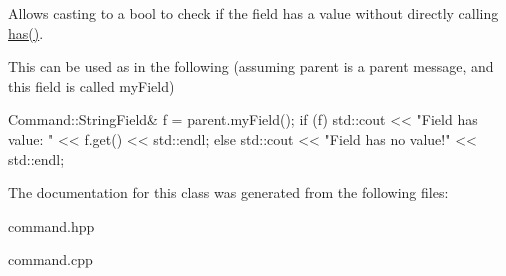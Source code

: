 Allows casting to a bool to check if the field has a value without directly calling {\ttfamily \hyperlink{classhebi_1_1Command_1_1StringField_a41f4d911e4445fc246c185a8b81b3788}{has()}}. 

This can be used as in the following (assuming \textquotesingle{}parent\textquotesingle{} is a parent message, and this field is called \textquotesingle{}my\+Field\textquotesingle{}) 
\begin{DoxyCode}
Command::StringField& f = parent.myField();
\textcolor{keywordflow}{if} (f)
  std::cout << \textcolor{stringliteral}{"Field has value: "} << f.get() << std::endl;
\textcolor{keywordflow}{else}
  std::cout << \textcolor{stringliteral}{"Field has no value!"} << std::endl;
\end{DoxyCode}
 

The documentation for this class was generated from the following files\+:\begin{DoxyCompactItemize}
\item 
command.\+hpp\item 
command.\+cpp\end{DoxyCompactItemize}
